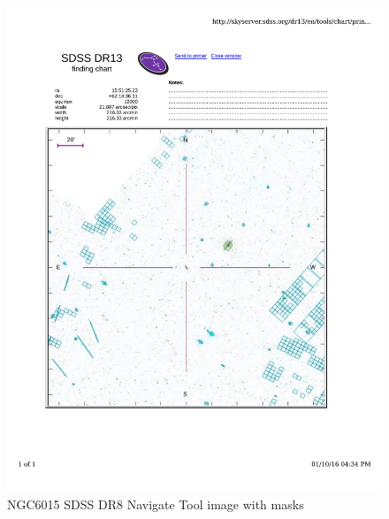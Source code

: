 \documentclass[10pt,letterpaper]{article}
\begin{document}
\begin{figure}[h!]
\centering
\includegraphics[scale=0.7]{figures/NGC6015.pdf}
\caption{NGC6015 SDSS DR8 Navigate Tool image with masks}
\end{figure}
\end{document}
